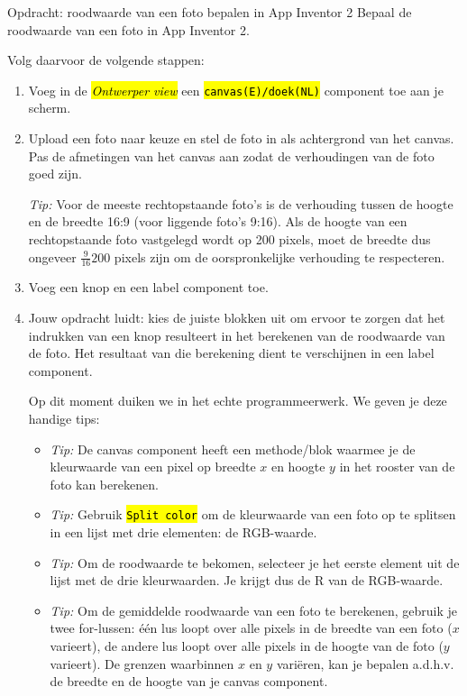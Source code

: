 \begin{opdracht}{Opdracht: roodwaarde van een foto bepalen in App Inventor 2}
Bepaal de roodwaarde van een foto in App Inventor 2.

Volg daarvoor de volgende stappen:
\begin{enumerate}
	\item Voeg  in de \hl{\emph{Ontwerper view}} een \hl{\texttt{canvas(E)/doek(NL)}} component toe aan je scherm. 
	\item Upload een foto naar keuze en stel de foto in als achtergrond van het canvas.
	Pas de afmetingen van het canvas aan zodat de verhoudingen van de foto goed zijn. 
	
	\emph{Tip:} Voor de meeste rechtopstaande foto's is de verhouding tussen de hoogte en de breedte 16:9 (voor liggende foto's 9:16). Als de hoogte van een rechtopstaande foto vastgelegd wordt op 200 pixels, moet de breedte dus ongeveer $\frac{9}{16}200$ pixels zijn om de oorspronkelijke verhouding te respecteren.
	 
	\item Voeg een knop en een label component toe.
	
	\item Jouw opdracht luidt: kies de juiste blokken uit om ervoor te zorgen dat het indrukken van een knop resulteert in het berekenen van de roodwaarde van de foto. Het resultaat van die berekening dient te verschijnen in een label component. 
	
	Op dit moment duiken we in het echte programmeerwerk. We geven je deze handige tips:
	
	\begin{itemize}
		\item \emph{Tip:} De canvas component heeft een methode/blok waarmee je de kleurwaarde van een pixel op breedte $x$ en hoogte $y$ in het rooster van de foto kan berekenen. 
		
		\item \emph{Tip:} Gebruik \hl{\texttt{Split color}} om de kleurwaarde van een foto op te splitsen in een lijst met drie elementen: de RGB-waarde.
		
		\item \emph{Tip:} Om de roodwaarde te bekomen, selecteer je het eerste element uit de lijst met de drie kleurwaarden. Je krijgt dus de R van de RGB-waarde.
		
		\item \emph{Tip:} Om de gemiddelde roodwaarde van een foto te berekenen, gebruik je twee for-lussen: \'e\'en lus loopt over alle pixels in de breedte van een foto ($x$ varieert), de andere lus loopt over alle pixels in de hoogte van de foto ($y$ varieert). De grenzen waarbinnen $x$ en $y$ vari\"eren, kan je bepalen a.d.h.v. de breedte en de hoogte van je canvas component.
		

\end{itemize}
\end{enumerate}
\end{opdracht}
